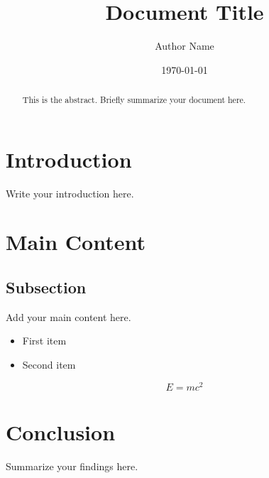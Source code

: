 \documentclass[11pt,a4paper]{article}
\title{Document Title}
\author{Author Name}
\date{\today}
\begin{document}
    \maketitle

    \begin{abstract}
        This is the abstract. Briefly summarize your document here.
    \end{abstract}

    \section{Introduction}
    Write your introduction here.

    \section{Main Content}
    \subsection{Subsection}
    Add your main content here.

    \begin{itemize}
        \item First item
        \item Second item
    \end{itemize}

    \begin{equation}
        E = mc^2
    \end{equation}

    \section{Conclusion}
    Summarize your findings here.

    
    
\end{document}
